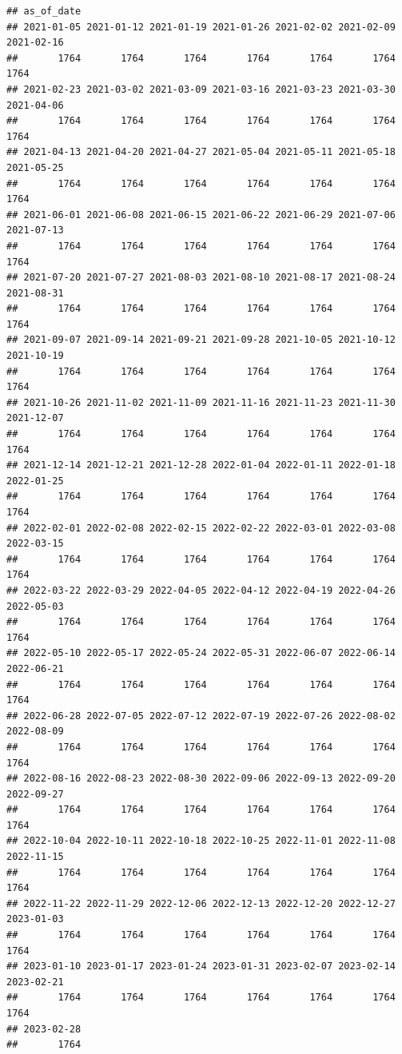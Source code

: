 \documentclass[
]{article}
\begin{document}
\begin{verbatim}
## as_of_date
## 2021-01-05 2021-01-12 2021-01-19 2021-01-26 2021-02-02 2021-02-09 2021-02-16 
##       1764       1764       1764       1764       1764       1764       1764 
## 2021-02-23 2021-03-02 2021-03-09 2021-03-16 2021-03-23 2021-03-30 2021-04-06 
##       1764       1764       1764       1764       1764       1764       1764 
## 2021-04-13 2021-04-20 2021-04-27 2021-05-04 2021-05-11 2021-05-18 2021-05-25 
##       1764       1764       1764       1764       1764       1764       1764 
## 2021-06-01 2021-06-08 2021-06-15 2021-06-22 2021-06-29 2021-07-06 2021-07-13 
##       1764       1764       1764       1764       1764       1764       1764 
## 2021-07-20 2021-07-27 2021-08-03 2021-08-10 2021-08-17 2021-08-24 2021-08-31 
##       1764       1764       1764       1764       1764       1764       1764 
## 2021-09-07 2021-09-14 2021-09-21 2021-09-28 2021-10-05 2021-10-12 2021-10-19 
##       1764       1764       1764       1764       1764       1764       1764 
## 2021-10-26 2021-11-02 2021-11-09 2021-11-16 2021-11-23 2021-11-30 2021-12-07 
##       1764       1764       1764       1764       1764       1764       1764 
## 2021-12-14 2021-12-21 2021-12-28 2022-01-04 2022-01-11 2022-01-18 2022-01-25 
##       1764       1764       1764       1764       1764       1764       1764 
## 2022-02-01 2022-02-08 2022-02-15 2022-02-22 2022-03-01 2022-03-08 2022-03-15 
##       1764       1764       1764       1764       1764       1764       1764 
## 2022-03-22 2022-03-29 2022-04-05 2022-04-12 2022-04-19 2022-04-26 2022-05-03 
##       1764       1764       1764       1764       1764       1764       1764 
## 2022-05-10 2022-05-17 2022-05-24 2022-05-31 2022-06-07 2022-06-14 2022-06-21 
##       1764       1764       1764       1764       1764       1764       1764 
## 2022-06-28 2022-07-05 2022-07-12 2022-07-19 2022-07-26 2022-08-02 2022-08-09 
##       1764       1764       1764       1764       1764       1764       1764 
## 2022-08-16 2022-08-23 2022-08-30 2022-09-06 2022-09-13 2022-09-20 2022-09-27 
##       1764       1764       1764       1764       1764       1764       1764 
## 2022-10-04 2022-10-11 2022-10-18 2022-10-25 2022-11-01 2022-11-08 2022-11-15 
##       1764       1764       1764       1764       1764       1764       1764 
## 2022-11-22 2022-11-29 2022-12-06 2022-12-13 2022-12-20 2022-12-27 2023-01-03 
##       1764       1764       1764       1764       1764       1764       1764 
## 2023-01-10 2023-01-17 2023-01-24 2023-01-31 2023-02-07 2023-02-14 2023-02-21 
##       1764       1764       1764       1764       1764       1764       1764 
## 2023-02-28 
##       1764
\end{verbatim}
\end{document}
